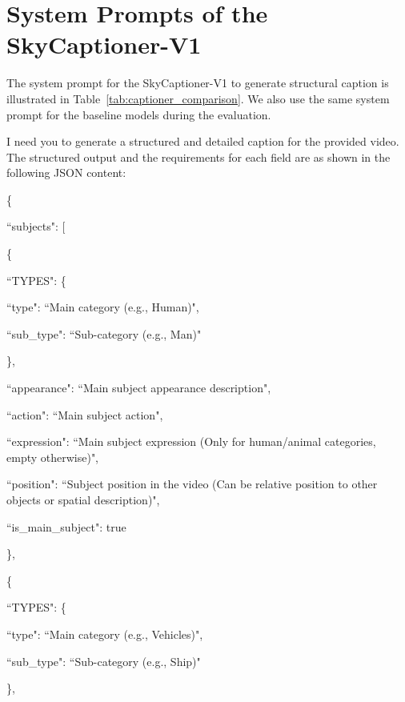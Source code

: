 \documentclass{article}
\begin{document}
\section{System Prompts of the SkyCaptioner-V1}
\label{app:skyreels-system-prompt}
The system prompt for the SkyCaptioner-V1 to generate structural caption is illustrated in Table~\ref{tab:captioner_comparison}. We also use the same system prompt for the baseline models during the evaluation.
\begin{tcolorbox}[
    breakable, %
    colback=white, %
    colframe=black!75, %
    title=System Prompt of Generating Structural Caption for Video, %
    fonttitle=\bfseries,
    width=\textwidth, %
  ]
I need you to generate a structured and detailed caption for the provided video. The structured output and the requirements for each field are as shown in the following JSON content: 

\{

\quad ``subjects": [
    
\qquad  \{

\qquad \quad ``TYPES": \{
            
\qquad \qquad     ``type": ``Main category (e.g., Human)",
                
\qquad \qquad     ``sub\_type": ``Sub-category (e.g., Man)"
                
\qquad \quad \}, 
        
\qquad \quad ``appearance": ``Main subject appearance description",
            
\qquad \quad ``action": ``Main subject action",
            
\qquad \quad ``expression": ``Main subject expression  (Only for human/animal categories, empty otherwise)",
            
\qquad \quad ``position": ``Subject position in the video (Can be relative position to other objects or spatial description)", 
            
\qquad \quad ``is\_main\_subject": true
            
\qquad  \}, 
        
\qquad  \{

\qquad \quad ``TYPES": \{
                
\qquad \qquad     ``type": ``Main category (e.g., Vehicles)",
                
\qquad \qquad     ``sub\_type": ``Sub-category (e.g., Ship)"

\qquad \quad \},
            

\end{tcolorbox}
\end{document}
